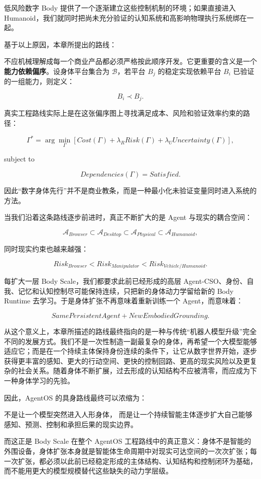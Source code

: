 低风险数字 Body 提供了一个逐渐建立这些控制机制的环境；如果直接进入 Humanoid，我们就同时把尚未充分验证的认知系统和高影响物理执行系统绑在一起。

基于以上原因，本章所提出的路线：

\begin{statementbox}
\centering
{}
\end{statementbox}

不应机械理解成每一个商业产品都必须严格按此顺序开发。它更重要的含义是一个\textbf{能力依赖偏序}。设身体平台集合为 $\mathcal B$，若平台 $B_j$ 的稳定实现依赖平台 $B_i$ 已验证的一组能力，则定义：

$$
B_i\prec B_j.
$$

真实工程路线实际上是在这张偏序图上寻找满足成本、风险和验证效率约束的路径：

$$
\Gamma^*
=
\arg\min_{\Gamma}
\left[
Cost(\Gamma)
+\lambda_R Risk(\Gamma)
+\lambda_U Uncertainty(\Gamma)
\right],
$$

subject to

$$
Dependencies(\Gamma)=Satisfied.
$$

因此“数字身体先行”并不是商业教条，而是一种最小化未验证变量同时进入系统的方法。

当我们沿着这条路线逐步前进时，真正不断扩大的是 Agent 与现实的耦合空间：

$$
\mathcal A_{Browser}
\subset
\mathcal A_{Desktop}
\subset
\mathcal A_{Physical}
\subset
\mathcal A_{Humanoid},
$$

同时现实约束也越来越强：

$$
Risk_{Browser}
<
Risk_{Manipulator}
<
Risk_{Vehicle/Humanoid}.
$$

每扩大一层 Body Scale，我们都要求此前已经形成的高层 Agent-CSO、身份、自我、记忆和认知控制尽可能保持连续，只把新的身体动力学留给新的 Body Runtime 去学习。于是身体扩张不再意味着重新训练一个 Agent，而意味着：

$$
\boxed{
SamePersistentAgent
+
NewEmbodiedGrounding.
}
$$

从这个意义上，本章所描述的路线最终指向的是一种与传统“机器人模型升级”完全不同的发展方式。我们不是一次性制造一副最复杂的身体，再希望一个大模型能够适应它；而是在一个持续主体保持身份连续的条件下，让它从数字世界开始，逐步获得更丰富的感知、更大的行动空间、更快的控制回路、更高的现实风险以及更复杂的社会关系。随着身体不断扩展，过去形成的认知结构不应被清零，而应成为下一种身体学习的先验。

因此，AgentOS 的具身路线最终可以浓缩为：

\begin{conclusion}
不是让一个模型突然进入人形身体，
而是让一个持续智能主体逐步扩大自己能够感知、预测、控制和承担后果的现实边界。
\end{conclusion}

而这正是 Body Scale 在整个 AgentOS 工程路线中的真正意义：身体不是智能的外围设备，身体扩张本身就是智能体生命周期中对现实可达空间的一次次扩张；每一次扩张，都必须以此前已经稳定形成的主体结构、认知结构和控制闭环为基础，而不能用更大的模型规模替代这些缺失的动力学层级。
